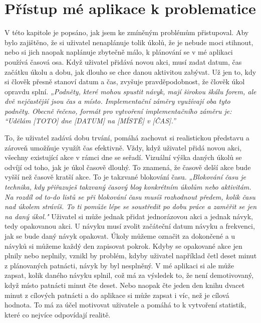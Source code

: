 \section{Přístup mé aplikace k problematice}
\hspace{14pt} V této kapitole je popsáno, jak jsem ke zmíněným problémům přistupoval. Aby bylo zajištěno, že si uživatel nenaplánuje tolik úkolů, že je nebude moci stihnout, nebo si jich naopak naplánuje zbytečně málo, k plánování se v mé aplikaci používá časová osa. Když uživatel přidává novou akci, musí zadat datum, čas začátku úkolu a dobu, jak dlouho se chce danou aktivitou zabývat. Už jen to, kdy si člověk přesně stanoví datum a čas, zvyšuje pravděpodobnost, že člověk úkol opravdu splní. \textit{„Podněty, které mohou spustit návyk, mají širokou škálu forem, ale dvě nejčastější jsou čas a místo. Implementační záměry využívají oba tyto podněty. Obecně řečeno, formát pro vytvoření implementačního záměru je: ``Udělám [TOTO] dne [DATUM] na [MÍSTĚ] v [ČAS].''}\cite{douglas2025}

To, že uživatel zadává dobu trvání, pomáhá zachovat si realistickou představu a zároveň umožňuje využít čas efektivně. Vždy, když uživatel přidá novou akci, všechny existující akce v rámci dne se seřadí. Vizuální výška daných úkolů se odvíjí od toho, jak je úkol časově dlouhý. To znamená, že časově delší akce bude vyšší než časově kratší akce. To je takzvané blokování času. \textit{„Blokování času je technika, kdy přiřazuješ takzvaný časový blog konkrétním úkolům nebo aktivitám. Na rozdíl od to-do listů se při blokování času musíš rozhodnout předem, kolik času nad úkolem strávíš. To ti pomůže lépe se soustředit po dobu práce a zaměřit se jen na daný úkol."}\cite{vos2025}
\newpage 
Uživatel si může jednak přidat jednorázovou akci a jednak návyk, tedy opakovanou akci. U návyku musí zvolit začáteční datum návyku a frekvenci, jak se bude daný návyk opakovat. Úkoly můžeme označit za dokončené a u návyků si můžeme každý den zapisovat pokrok. Kdyby se opakované akce jen plnily nebo neplnily, vznikl by problém, kdyby uživatel například četl deset minut z plánovaných patnácti, návyk by byl nesplněný. V mé aplikaci si ale může zapsat, kolik daného návyku splnil, což má za výsledek to, že není demotivovaný, když místo patnácti minut čte deset. Nebo naopak čte jeden den knihu dvacet minut z cílových patnácti a do aplikace si může zapsat i víc, než je cílová hodnota. To má za účel motivovat uživatele a pomáhá to k vytvoření statistik, které co nejvíce odpovídají realitě.

